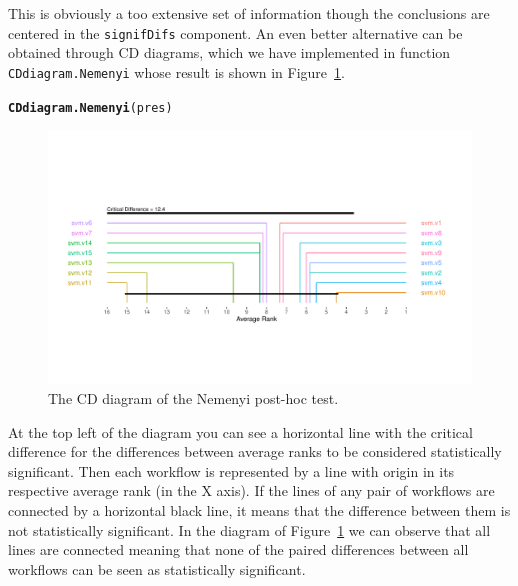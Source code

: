 \documentclass[10pt,a4paper]{article}\usepackage[]{graphicx}\usepackage[]{color}
\makeatletter
\newcommand{\hlstd}[1]{\textcolor[rgb]{0.345,0.345,0.345}{#1}}%
\newcommand{\hlkwd}[1]{\textcolor[rgb]{0.737,0.353,0.396}{\textbf{#1}}}%
\newenvironment{kframe}{%
 \def\at@end@of@kframe{}%
 \ifinner\ifhmode%
  \def\at@end@of@kframe{\end{minipage}}%
  \begin{minipage}{\columnwidth}%
 \fi\fi%
 \def\FrameCommand##1{\hskip\@totalleftmargin \hskip-\fboxsep
 \colorbox{shadecolor}{##1}\hskip-\fboxsep
     \hskip-\linewidth \hskip-\@totalleftmargin \hskip\columnwidth}%
 \MakeFramed {\advance\hsize-\width
   \@totalleftmargin\z@ \linewidth\hsize
   \@setminipage}}%
 {\par\unskip\endMakeFramed%
 \at@end@of@kframe}
\newenvironment{knitrout}{}{} %
\makeatother
\begin{document}
This is obviously a too extensive set of information though the conclusions are centered in the \texttt{signifDifs} component. An even better alternative can be obtained through CD diagrams, which we have implemented in function \texttt{CDdiagram.Nemenyi} whose result is shown in Figure~\ref{fig:cdn}.


\begin{knitrout}\scriptsize
{}\color{fgcolor}\begin{kframe}
\begin{alltt}
\hlkwd{CDdiagram.Nemenyi}\hlstd{(pres)}
\end{alltt}
\end{kframe}\begin{figure}

{\centering \includegraphics[width=\textwidth]{figures/perfEst-cdn-1} 

}

\caption[The CD diagram of the Nemenyi post-hoc test]{The CD diagram of the Nemenyi post-hoc test.}\label{fig:cdn}
\end{figure}


\end{knitrout}

At the top left of the diagram you can see a horizontal line with the critical difference for the differences between average ranks to be considered statistically significant. Then each workflow is represented by a line with origin in its respective average rank (in the X axis). If the lines of any pair of workflows are connected by a horizontal black line, it means that the difference between them is not statistically significant. In the diagram of Figure~\ref{fig:cdn} we can observe that all lines are connected meaning that none of the paired differences between all workflows can be seen as statistically significant.
\end{document}
